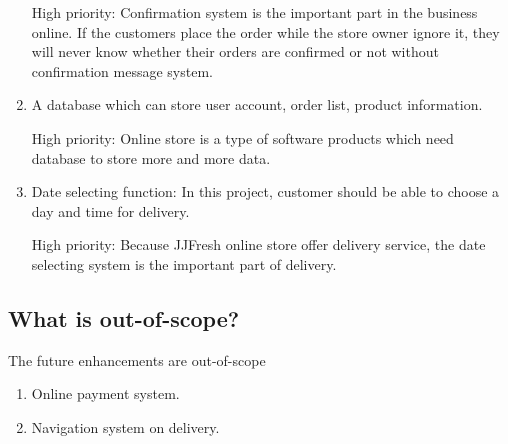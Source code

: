 \documentclass{report}
\begin{document}
\begin{enumerate}
  High priority: Confirmation system is the important part in the business online. If the customers place the order while the store owner ignore it, they will never know whether their orders are confirmed or not without confirmation message system.
  
  \item A database which can store user account, order list, product information.
  
  High priority: Online store is a type of software products which need database to store more and more data.
  
  \item Date selecting function: In this project, customer should be able to choose a day and time for delivery.
  
  High priority: Because JJFresh online store offer delivery service, the date selecting system is the important part of delivery.
\end{enumerate}
\subsection{What is out-of-scope?}
The future enhancements are out-of-scope
\begin{enumerate}
  \item Online payment system.
  \item Navigation system on delivery.
\end{enumerate}
\end{document}

